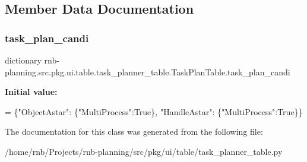 \subsection{Member Data Documentation}
\mbox{\label{classrnb-planning_1_1src_1_1pkg_1_1ui_1_1table_1_1task__planner__table_1_1_task_plan_table_af05cca21d2a29f3092d43335409db751}} 
\subsubsection{\texorpdfstring{task\+\_\+plan\+\_\+candi}{task\_plan\_candi}}
{\footnotesize\ttfamily dictionary rnb-\/planning.\+src.\+pkg.\+ui.\+table.\+task\+\_\+planner\+\_\+table.\+Task\+Plan\+Table.\+task\+\_\+plan\+\_\+candi\hspace{0.3cm}{\ttfamily [static]}}

{\bfseries Initial value\+:}
\begin{DoxyCode}
=  \{\textcolor{stringliteral}{"ObjectAstar"}: \{\textcolor{stringliteral}{"MultiProcess"}:\textcolor{keyword}{True}\},
                       \textcolor{stringliteral}{"HandleAstar"}: \{\textcolor{stringliteral}{"MultiProcess"}:\textcolor{keyword}{True}\}\}
\end{DoxyCode}


The documentation for this class was generated from the following file\+:\begin{DoxyCompactItemize}
\item 
/home/rnb/\+Projects/rnb-\/planning/src/pkg/ui/table/task\+\_\+planner\+\_\+table.\+py\end{DoxyCompactItemize}
